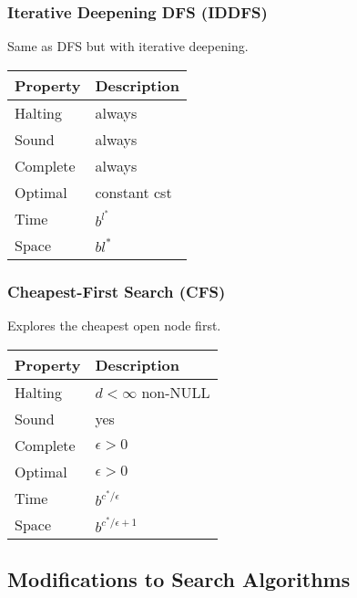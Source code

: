 \subsubsection{Iterative Deepening DFS (IDDFS)}
\begin{definition}
    Same as DFS but with iterative deepening.
    \begin{center}
        \begin{tabular}{|p{3cm}|p{3cm}|}
        \hline
        \textbf{Property} & \textbf{Description} \\ \hline
        Halting & always \\ \hline
        Sound & always \\ \hline
        Complete & always \\ \hline
        Optimal & constant cst \\ \hline
        Time & $b^{l^*}$ \\ \hline
        Space & $bl^*$ \\ \hline
        \end{tabular}
    \end{center}    
\end{definition}

\subsubsection{Cheapest-First Search (CFS)}
\begin{definition}
    Explores the cheapest open node first.
    \begin{center}
        \begin{tabular}{|p{3cm}|p{3cm}|}
        \hline
        \textbf{Property} & \textbf{Description} \\ \hline
        Halting & $d < \infty$ \newline non-NULL \\ \hline
        Sound & yes \\ \hline
        Complete & $\epsilon > 0$ \\ \hline
        Optimal & $\epsilon > 0$ \\ \hline
        Time & $b^{c^*/\epsilon}$ \\ \hline
        Space & $b^{c^*/\epsilon + 1}$ \\ \hline
        \end{tabular}
    \end{center}    
\end{definition}

\subsection{Modifications to Search Algorithms}

